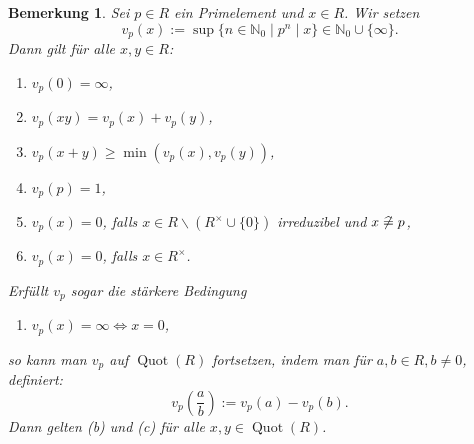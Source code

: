 \documentclass[a4paper, twoside, 11pt, ngerman]{report}
\newcommand{\NN}{\mathds N}
\renewcommand{\setminus}{\smallsetminus}
\newcommand{\assoc}{\mathrel{\widehat{=}}}
\DeclareMathOperator{\Quot}{Quot}
\theoremstyle{definistyle}
\newtheorem{bem}[satz]{Bemerkung}
\theoremstyle{remark}
\begin{document}
\begin{bem}\label{bem:p-adische_bewertung}
Sei $p \in R$ ein Primelement und $x \in R$. Wir setzen
\[
v_p(x) := \sup \{n \in \NN_0 \mid p^n \mid x\} \in \NN_0 \cup \{\infty\}.
\]
Dann gilt für alle $x, y \in R$:
\begin{enumerate}[label=(\alph*)]
    \item $v_p(0) = \infty$,
    \item $v_p(xy) = v_p(x) + v_p(y)$,
    \item $v_p(x + y) \geq \min(v_p(x), v_p(y))$,
    \item $v_p(p) = 1$,
    \item $v_p(x) = 0$, falls $x \in R \setminus (R^\times \cup \{0\})$ irreduzibel und $x \not\assoc p$,
    \item $v_p(x) = 0$, falls $x \in R^\times$.
\end{enumerate}

Erfüllt $v_p$ sogar die stärkere Bedingung
\begin{enumerate}
    \item[(a')] $v_p(x) = \infty \iff x = 0$,
\end{enumerate}
so kann man $v_p$ auf $\Quot(R)$ fortsetzen, indem man für $a, b \in R, b \neq 0$, definiert:
\[
v_p\left(\frac{a}{b}\right) := v_p(a) - v_p(b).
\]
Dann gelten (b) und (c) für alle $x, y \in \Quot(R)$.
\end{bem}
\end{document}
